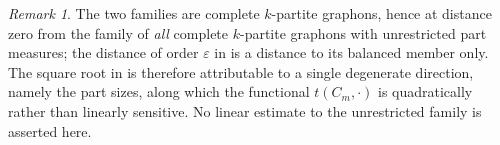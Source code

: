 \documentclass[11pt]{article}
\theoremstyle{remark}
\newtheorem{remark}[theorem]{Remark}
\begin{document}
\begin{remark}
The two families are complete $k$-partite graphons, hence at distance
zero from the family of \emph{all} complete $k$-partite graphons with
unrestricted part measures; the distance of order $\varepsilon$ in
 is a distance to its balanced member only. The square
root in  is therefore attributable to a single degenerate
direction, namely the part sizes, along which the functional
$t(C_m,\cdot)$ is quadratically rather than linearly sensitive. No
linear estimate to the unrestricted family is asserted here.
\end{remark}



\end{document}
